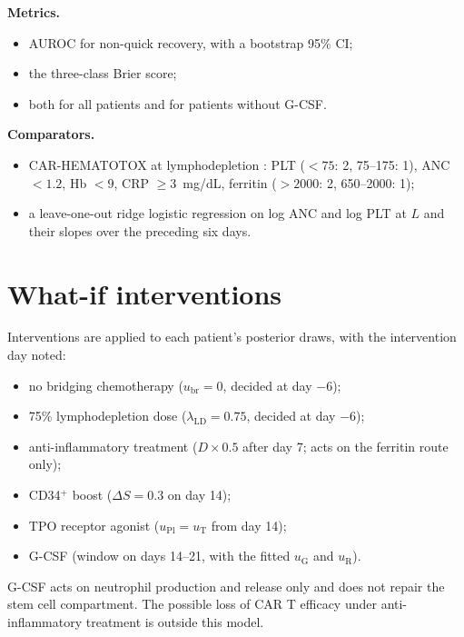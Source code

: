 \documentclass[11pt]{article}
\begin{document}
\textbf{Metrics.}
\begin{itemize}
\item AUROC for non-quick recovery, with a bootstrap 95\% CI;
\item the three-class Brier score;
\item both for all patients and for patients without G-CSF.
\end{itemize}
\textbf{Comparators.}
\begin{itemize}
\item CAR-HEMATOTOX at lymphodepletion \citep{rejeski2021}: PLT ($<75$: 2, 75--175: 1), ANC $<1.2$, Hb $<9$, CRP $\geq3$~mg/dL, ferritin ($>2000$: 2, 650--2000: 1);
\item a leave-one-out ridge logistic regression on log ANC and log PLT at $L$ and their slopes over the preceding six days.
\end{itemize}

\section{What-if interventions}
Interventions are applied to each patient's posterior draws, with the intervention day noted:
\begin{itemize}
\item no bridging chemotherapy ($u_{\mathrm{br}}=0$, decided at day $-6$);
\item 75\% lymphodepletion dose ($\lambda_{\mathrm{LD}}=0.75$, decided at day $-6$);
\item anti-inflammatory treatment ($D\times0.5$ after day 7; acts on the ferritin route only);
\item CD34$^+$ boost ($\Delta S=0.3$ on day 14);
\item TPO receptor agonist ($u_{\mathrm{Pl}}=u_{\mathrm{T}}$ from day 14);
\item G-CSF (window on days 14--21, with the fitted $u_{\mathrm{G}}$ and $u_{\mathrm{R}}$).
\end{itemize}
G-CSF acts on neutrophil production and release only and does not repair the stem cell compartment. The possible loss of CAR T efficacy under anti-inflammatory treatment is outside this model.

\end{document}
